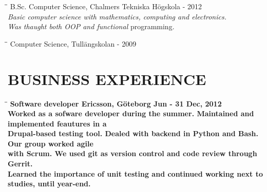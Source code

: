 \documentclass[11pt]{res}
\begin{document}
\begin{resume}
	\begin{tabbing}
		\hspace{2.3in}\= \hspace{2.6in}\= \kill 
	 	B.Sc. Computer Science, Chalmers Tekniska Högskola \>  - 2012 \\
		\textit{Basic computer science with mathematics, computing and electronics. } \\
		\textit{Was thaught both OOP and functional} programming.
	\end{tabbing}

\vspace{-25pt}

       \begin{tabbing}
       		\hspace{2.3in}\= \hspace{2.6in}\= \kill
   		Computer Science, Tullängskolan \>  - 2009 
       \end{tabbing}

\section{BUSINESS EXPERIENCE}
\vspace{-0.1in}	

	\begin{tabbing}
		 \hspace{2.3in}\= \hspace{2.6in}\= \kill %
		 \bf {Software developer} \>Ericsson, Göteborg  Jun - 31 Dec, 2012\\
		Worked as a sofware developer during the summer. Maintained and implemented feautures in a \\ Drupal-based testing tool. Dealed with backend in Python and Bash. Our group worked agile \\ with Scrum. We used git as version control and code review through Gerrit. \\ Learned the importance of unit testing and continued working next to studies, until year-end. 
	 \end{tabbing}


\end{resume}
\end{document}
